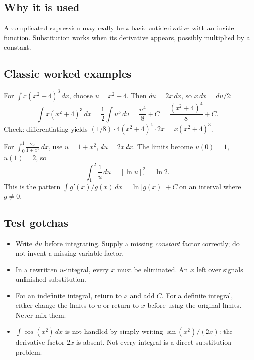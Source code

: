 \documentclass[11pt]{article}
\newcommand{\dx}{\,dx}
\begin{document}
\subsection*{Why it is used}
A complicated expression may really be a basic antiderivative with an inside function. Substitution works when its derivative appears, possibly multiplied by a constant.

\subsection*{Classic worked examples}
For $\int x(x^2+4)^3\dx$, choose $u=x^2+4$. Then $du=2x\,dx$, so $x\,dx=du/2$:
\[
\int x(x^2+4)^3\dx=\frac12\int u^3\,du
=\frac{u^4}{8}+C=\frac{(x^2+4)^4}{8}+C.
\]
Check: differentiating yields $(1/8)\cdot4(x^2+4)^3\cdot2x=x(x^2+4)^3$.

For $\int_0^1\frac{2x}{1+x^2}\dx$, use $u=1+x^2$, $du=2x\,dx$.
The limits become $u(0)=1$, $u(1)=2$, so
\[
\int_1^2\frac1u\,du=[\ln u]_1^2=\ln2.
\]
This is the pattern $\int g'(x)/g(x)\dx=\ln|g(x)|+C$ on an interval where $g\ne0$.

\subsection*{Test gotchas}
\begin{itemize}
\item Write $du$ before integrating. Supply a missing \emph{constant} factor correctly; do not invent a missing variable factor.
\item In a rewritten $u$-integral, every $x$ must be eliminated. An $x$ left over signals unfinished substitution.
\item For an indefinite integral, return to $x$ and add $C$. For a definite integral, either change the limits to $u$ or return to $x$ before using the original limits. Never mix them.
\item $\int\cos(x^2)\dx$ is not handled by simply writing $\sin(x^2)/(2x)$: the derivative factor $2x$ is absent. Not every integral is a direct substitution problem.
\end{itemize}
\end{document}
